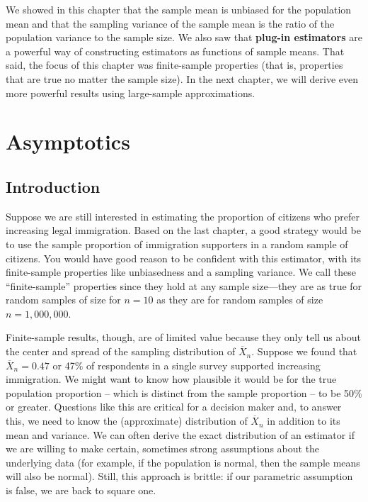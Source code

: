 \documentclass[
  letterpaper,
  DIV=11,
  numbers=noendperiod]{scrreprt}
\newcommand{\Xbar}{\overline{X}}
\theoremstyle{plain}
\theoremstyle{definition}
\theoremstyle{definition}
\theoremstyle{remark}
\begin{document}
We showed in this chapter that the sample mean is unbiased for the
population mean and that the sampling variance of the sample mean is the
ratio of the population variance to the sample size. We also saw that
\textbf{plug-in estimators} are a powerful way of constructing
estimators as functions of sample means. That said, the focus of this
chapter was finite-sample properties (that is, properties that are true
no matter the sample size). In the next chapter, we will derive even
more powerful results using large-sample approximations.

\hypertarget{sec-asymptotics}{%
\chapter{Asymptotics}\label{sec-asymptotics}}

\hypertarget{introduction-3}{%
\section{Introduction}\label{introduction-3}}

Suppose we are still interested in estimating the proportion of citizens
who prefer increasing legal immigration. Based on the last chapter, a
good strategy would be to use the sample proportion of immigration
supporters in a random sample of citizens. You would have good reason to
be confident with this estimator, with its finite-sample properties like
unbiasedness and a sampling variance. We call these ``finite-sample''
properties since they hold at any sample size---they are as true for
random samples of size for \(n = 10\) as they are for random samples of
size \(n = 1,000,000\).

Finite-sample results, though, are of limited value because they only
tell us about the center and spread of the sampling distribution of
\(\Xbar_n\). Suppose we found that \(\Xbar_n = 0.47\) or 47\% of
respondents in a single survey supported increasing immigration. We
might want to know how plausible it would be for the true population
proportion -- which is distinct from the sample proportion -- to be 50\%
or greater. Questions like this are critical for a decision maker and,
to answer this, we need to know the (approximate) distribution of
\(\Xbar_n\) in addition to its mean and variance. We can often derive
the exact distribution of an estimator if we are willing to make
certain, sometimes strong assumptions about the underlying data (for
example, if the population is normal, then the sample means will also be
normal). Still, this approach is brittle: if our parametric assumption
is false, we are back to square one.
\end{document}
